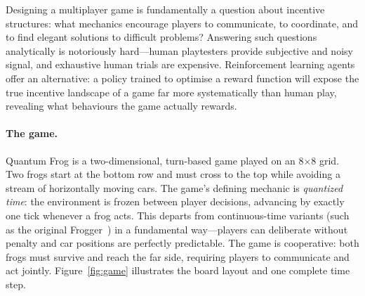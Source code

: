 \documentclass[12pt]{article}
\begin{document}
Designing a multiplayer game is fundamentally a question about incentive
structures: what mechanics encourage players to communicate, to coordinate,
and to find elegant solutions to difficult problems?  Answering such questions
analytically is notoriously hard—human playtesters provide subjective and
noisy signal, and exhaustive human trials are expensive.  Reinforcement
learning agents offer an alternative: a policy trained to optimise a reward
function will expose the true incentive landscape of a game far more
systematically than human play, revealing what behaviours the game
actually rewards.

\paragraph{The game.}
Quantum Frog is a two-dimensional, turn-based game played on an 8$\times$8
grid.  Two frogs start at the bottom row and must cross to the top while
avoiding a stream of horizontally moving cars.  The game's defining mechanic
is \emph{quantized time}: the environment is frozen between player decisions,
advancing by exactly one tick whenever a frog acts.  This departs from
continuous-time variants (such as the original Frogger~\citep{konami1981})
in a fundamental way—players can deliberate without penalty and car positions
are perfectly predictable.  The game is cooperative: both frogs must survive
and reach the far side, requiring players to communicate and act jointly.
Figure~\ref{fig:game} illustrates the board layout and one complete time step.
\end{document}
